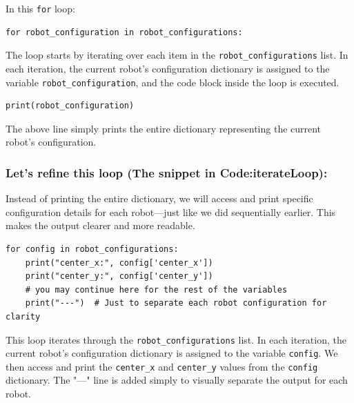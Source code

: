 In this \texttt{for} loop:

\begin{verbatim}
for robot_configuration in robot_configurations:
\end{verbatim}

The loop starts by iterating over each item in the \texttt{robot\_configurations} list. In each iteration, the current robot's configuration dictionary is assigned to the variable \texttt{robot\_configuration}, and the code block inside the loop is executed.

\begin{verbatim}
print(robot_configuration)
\end{verbatim}

The above line simply prints the entire dictionary representing the current robot's configuration.

\vspace{0.5cm}

\subsubsection{Let's refine this loop (The snippet in Code:iterateLoop):}
\label{sec:refineloop}
Instead of printing the entire dictionary, we will access and print specific configuration details for each robot—just like we did sequentially earlier. This makes the output clearer and more readable.




\begin{verbatim}
for config in robot_configurations:
    print("center_x:", config['center_x'])
    print("center_y:", config['center_y'])
    # you may continue here for the rest of the variables
    print("---")  # Just to separate each robot configuration for clarity
\end{verbatim}

This loop iterates through the \texttt{robot\_configurations} list. In each iteration, the current robot's configuration dictionary is assigned to the variable \texttt{config}. We then access and print the \texttt{center\_x} and \texttt{center\_y} values from the \texttt{config} dictionary. The "---" line is added simply to visually separate the output for each robot.



